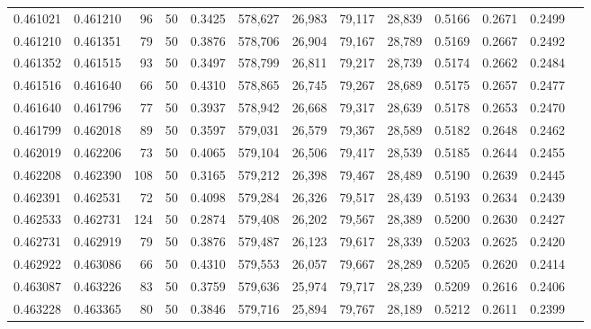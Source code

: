 \begin{tabular}{rrrrrrrrrrrrr}
0.461021 & 0.461210 &    96 &  50 &                                     0.3425 & 578,627 &  26,983 &  79,117 &  28,839 & 0.5166 & 0.2671 & 0.2499 \\
0.461210 & 0.461351 &    79 &  50 &                                     0.3876 & 578,706 &  26,904 &  79,167 &  28,789 & 0.5169 & 0.2667 & 0.2492 \\
0.461352 & 0.461515 &    93 &  50 &                                     0.3497 & 578,799 &  26,811 &  79,217 &  28,739 & 0.5174 & 0.2662 & 0.2484 \\
0.461516 & 0.461640 &    66 &  50 &                                     0.4310 & 578,865 &  26,745 &  79,267 &  28,689 & 0.5175 & 0.2657 & 0.2477 \\
0.461640 & 0.461796 &    77 &  50 &                                     0.3937 & 578,942 &  26,668 &  79,317 &  28,639 & 0.5178 & 0.2653 & 0.2470 \\
0.461799 & 0.462018 &    89 &  50 &                                     0.3597 & 579,031 &  26,579 &  79,367 &  28,589 & 0.5182 & 0.2648 & 0.2462 \\
0.462019 & 0.462206 &    73 &  50 &                                     0.4065 & 579,104 &  26,506 &  79,417 &  28,539 & 0.5185 & 0.2644 & 0.2455 \\
0.462208 & 0.462390 &   108 &  50 &                                     0.3165 & 579,212 &  26,398 &  79,467 &  28,489 & 0.5190 & 0.2639 & 0.2445 \\
0.462391 & 0.462531 &    72 &  50 &                                     0.4098 & 579,284 &  26,326 &  79,517 &  28,439 & 0.5193 & 0.2634 & 0.2439 \\
0.462533 & 0.462731 &   124 &  50 &                                     0.2874 & 579,408 &  26,202 &  79,567 &  28,389 & 0.5200 & 0.2630 & 0.2427 \\
0.462731 & 0.462919 &    79 &  50 &                                     0.3876 & 579,487 &  26,123 &  79,617 &  28,339 & 0.5203 & 0.2625 & 0.2420 \\
0.462922 & 0.463086 &    66 &  50 &                                     0.4310 & 579,553 &  26,057 &  79,667 &  28,289 & 0.5205 & 0.2620 & 0.2414 \\
0.463087 & 0.463226 &    83 &  50 &                                     0.3759 & 579,636 &  25,974 &  79,717 &  28,239 & 0.5209 & 0.2616 & 0.2406 \\
0.463228 & 0.463365 &    80 &  50 &                                     0.3846 & 579,716 &  25,894 &  79,767 &  28,189 & 0.5212 & 0.2611 & 0.2399 \\

\end{tabular}
